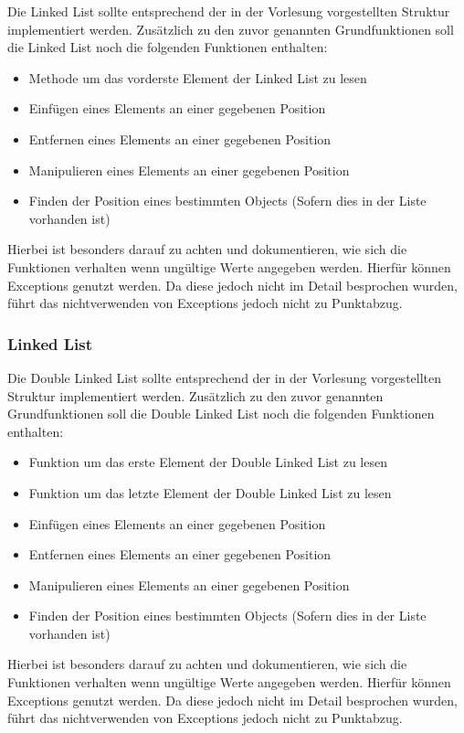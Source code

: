 \documentclass[a4paper,
			   fontsize=12pt]{article}
\begin{document}
Die Linked List sollte entsprechend der in der Vorlesung vorgestellten Struktur implementiert werden. Zusätzlich zu den zuvor genannten Grundfunktionen soll die Linked List noch die folgenden Funktionen enthalten:
\begin{itemize}
	\item Methode um das vorderste Element der Linked List zu lesen
	\item Einfügen eines Elements an einer gegebenen Position
	\item Entfernen eines Elements an einer gegebenen Position
	\item Manipulieren eines Elements an einer gegebenen Position
	\item Finden der Position eines bestimmten Objects (Sofern dies in der Liste vorhanden ist)
\end{itemize}

Hierbei ist besonders darauf zu achten und dokumentieren, wie sich die Funktionen verhalten wenn ungültige Werte angegeben werden. Hierfür können Exceptions genutzt werden. Da diese jedoch nicht im Detail besprochen
wurden, führt das nichtverwenden von Exceptions jedoch nicht zu Punktabzug.

\subsubsection*{Linked List}

Die Double Linked List sollte entsprechend der in der Vorlesung vorgestellten Struktur implementiert werden. Zusätzlich zu den zuvor genannten Grundfunktionen soll die Double Linked List noch die folgenden Funktionen enthalten:
\begin{itemize}
	\item Funktion um das erste Element der Double Linked List zu lesen
	\item Funktion um das letzte Element der Double Linked List zu lesen
	\item Einfügen eines Elements an einer gegebenen Position
	\item Entfernen eines Elements an einer gegebenen Position
	\item Manipulieren eines Elements an einer gegebenen Position
	\item Finden der Position eines bestimmten Objects (Sofern dies in der Liste vorhanden ist)
\end{itemize}

Hierbei ist besonders darauf zu achten und dokumentieren, wie sich die Funktionen verhalten wenn ungültige Werte angegeben werden. Hierfür können Exceptions genutzt werden. Da diese jedoch nicht im Detail besprochen
wurden, führt das nichtverwenden von Exceptions jedoch nicht zu Punktabzug.
\end{document}

